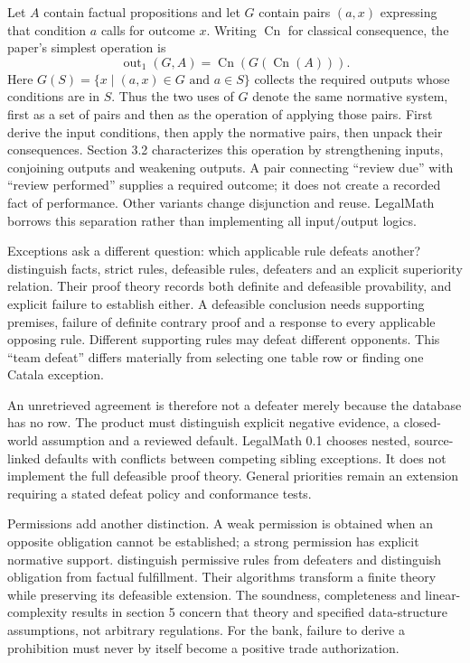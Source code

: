 \documentclass[12pt,a4paper,oneside,openany]{book}
\begin{document}
Let $A$ contain factual propositions and let $G$ contain pairs $(a,x)$ expressing
that condition $a$ calls for outcome $x$. Writing $\operatorname{Cn}$ for classical
consequence, the paper's simplest operation is
\begin{equation}
 \operatorname{out}_1(G,A)
 =\operatorname{Cn}\!\left(G\!\left(\operatorname{Cn}(A)\right)\right).
 \label{eq:io}
\end{equation}
Here $G(S)=\{x\mid (a,x)\in G\text{ and }a\in S\}$ collects the required
outputs whose conditions are in $S$. Thus the two uses of $G$ denote the same
normative system, first as a set of pairs and then as the operation of applying
those pairs. First derive the input conditions, then apply the normative pairs, then unpack
their consequences. Section 3.2 characterizes this operation by strengthening
inputs, conjoining outputs and weakening outputs. A pair connecting ``review
due'' with ``review performed'' supplies a required outcome; it does not create
a recorded fact of performance. Other variants change disjunction and reuse.
LegalMath borrows this separation rather than implementing all input/output logics.

Exceptions ask a different question: which applicable rule defeats another?
\citet[sec.~2]{defeasible2000} distinguish facts, strict rules, defeasible rules,
defeaters and an explicit superiority relation. Their proof theory records both
definite and defeasible provability, and explicit failure to establish either.
A defeasible conclusion needs supporting premises, failure of definite contrary
proof and a response to every applicable opposing rule. Different supporting
rules may defeat different opponents. This ``team defeat'' differs materially
from selecting one table row or finding one Catala exception.

An unretrieved agreement is therefore not a defeater merely because the database
has no row. The product must distinguish explicit negative evidence, a
closed-world assumption and a reviewed default. LegalMath 0.1 chooses nested,
source-linked defaults with conflicts between competing sibling exceptions. It
does not implement the full defeasible proof theory. General priorities remain
an extension requiring a stated defeat policy and conformance tests.

Permissions add another distinction. A weak permission is obtained when an
opposite obligation cannot be established; a strong permission has explicit
normative support. \citet[secs.~2--3, 6]{permissions2012} distinguish permissive
rules from defeaters and distinguish obligation from factual fulfillment.
Their algorithms transform a finite theory while preserving its defeasible
extension. The soundness, completeness and linear-complexity results in section 5
concern that theory and specified data-structure assumptions, not arbitrary
regulations. For the bank, failure to derive a prohibition must never by itself
become a positive trade authorization.
\end{document}
